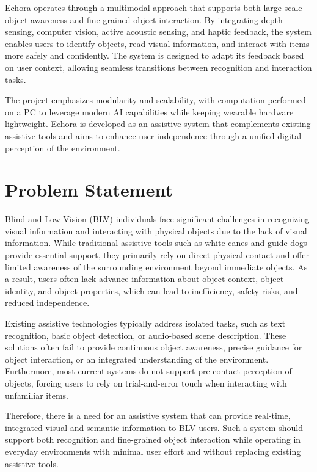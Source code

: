 Echora operates through a multimodal approach that supports both large-scale object awareness and fine-grained object interaction. By integrating depth sensing, computer vision, active acoustic sensing, and haptic feedback, the system enables users to identify objects, read visual information, and interact with items more safely and confidently. The system is designed to adapt its feedback based on user context, allowing seamless transitions between recognition and interaction tasks.

The project emphasizes modularity and scalability, with computation performed on a PC to leverage modern AI capabilities while keeping wearable hardware lightweight. Echora is developed as an assistive system that complements existing assistive tools and aims to enhance user independence through a unified digital perception of the environment.

\section{Problem Statement}

Blind and Low Vision (BLV) individuals face significant challenges in recognizing visual information and interacting with physical objects due to the lack of visual information. While traditional assistive tools such as white canes and guide dogs provide essential support, they primarily rely on direct physical contact and offer limited awareness of the surrounding environment beyond immediate objects. As a result, users often lack advance information about object context, object identity, and object properties, which can lead to inefficiency, safety risks, and reduced independence.

Existing assistive technologies typically address isolated tasks, such as text recognition, basic object detection, or audio-based scene description. These solutions often fail to provide continuous object awareness, precise guidance for object interaction, or an integrated understanding of the environment. Furthermore, most current systems do not support pre-contact perception of objects, forcing users to rely on trial-and-error touch when interacting with unfamiliar items.

Therefore, there is a need for an assistive system that can provide real-time, integrated visual and semantic information to BLV users. Such a system should support both recognition and fine-grained object interaction while operating in everyday environments with minimal user effort and without replacing existing assistive tools.

